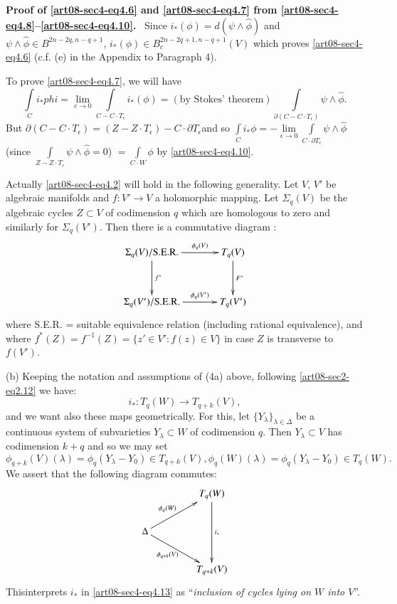 \medskip
\noindent
{\bf Proof of \eqref{art08-sec4-eq4.6} and \eqref{art08-sec4-eq4.7} from \eqref{art08-sec4-eq4.8}--\eqref{art08-sec4-eq4.10}.}~ Since $i_{*}(\phi)=d(\psi\wedge \widehat{\phi})$ and $\psi\wedge\widehat{\phi}\in B^{2n-2q,n-q+1}$, $i_{*}(\phi)\in B^{2n-2q+1,n-q+1}_{c}(V)$ which proves \eqref{art08-sec4-eq4.6} (c.f. (e) in the Appendix to Paragraph 4).

To prove \eqref{art08-sec4-eq4.7}, we will have
$$
\int\limits_{C}i_{*}phi=\lim\limits_{e\to 0}\int\limits_{C-C\cdot T_{\epsilon}}i_{*}(\phi)=(\text{by Stokes' theorem})\int\limits_{\partial(C-C\cdot T_{\epsilon})}\psi\wedge \widehat{\phi}.
$$
But $\partial(C-C\cdot T_{\epsilon})=(Z-Z\cdot T_{\epsilon})-C\cdot \partial T_{\epsilon}$\pageoriginale and so $\int\limits_{C}i_{*}\phi=-\lim\limits_{\epsilon\to 0}\int\limits_{C\cdot \partial T_{\epsilon}}\psi \wedge \widehat{\phi}$ (since $\int\limits_{Z-Z\cdot T_{\epsilon}}\psi \wedge \widehat{\phi}=0$) $=\int\limits_{C\cdot W}\phi$ by \eqref{art08-sec4-eq4.10}.

\setcounter{theorem}{11}
\begin{remark}\label{art08-sec4-rem4.12}
Actually \eqref{art08-sec4-eq4.2} will hold in the following generality. Let $V$, $V'$ be algebraic manifolds and $f:V'\to V$ a holomorphic mapping. Let $\Sigma_{q}(V)$ be the algebraic cycles $Z\subset V$ of codimension $q$ which are homologous to zero and similarly for $\Sigma_{q}(V')$. Then there is a commutative diagram :
\[
\xymatrix@=1.2cm{
\Sigma_{q}(V)/\text{S.E.R.}\ar[d]^-{f^{*}}\ar[r]^-{\phi_{q}(V)} & T_{q}(V)\ar[d]^-{F^{*}}\\
\Sigma_{q}(V')/\text{S.E.R.}\ar[r]^-{\phi_{q}(V')} & T_{q}(V')
}
\]
where S.E.R. = suitable equivalence relation (including rational equivalence), and where $f^{*}(Z)=f^{-1}(Z)=\{z'\in V':f(z)\in V\}$ in case $Z$ is transverse to $f(V')$.

(b) Keeping the notation and assumptions of (4a) above, following \eqref{art08-sec2-eq2.12} we have:
\begin{equation}
i_{*}:T_{q}(W)\to T_{q+k}(V),\label{art08-sec4-eq4.13}
\end{equation}
and we want also these maps geometrically. For this, let $\{Y_{\lambda}\}_{\lambda\in \Delta}$ be a continuous system of subvarieties $Y_{\lambda}\subset W$ of codimension $q$. Then $Y_{\lambda}\subset V$ has codimension $k+q$ and so we may set
$$
\phi_{q+k}(V)(\lambda)=\phi_{q}(Y_{\lambda}-Y_{0})\in T_{q+k}(V),\phi_{q}(W)(\lambda)=\phi_{q}(Y_{\lambda}-Y_{0})\in T_{q}(W).
$$
We assert that the following diagram commutes:
\setcounter{equation}{13}
\begin{equation}
\vcenter{\xymatrix@C=1.5cm{
 & T_{q}(W)\ar[dd]^-{i_{*}}\\
\Delta\ar[ur]^-{\phi_{q}(W)}\ar[dr]_-{\phi_{q+k}(V)} &\\
 & T_{q+k}(V)
}}\label{art08-sec4-eq4.14}
\end{equation}
This\pageoriginale interprets $i_{*}$ in \eqref{art08-sec4-eq4.13} as ``{\em inclusion of cycles lying on $W$ into $V$}''.
\end{remark}

